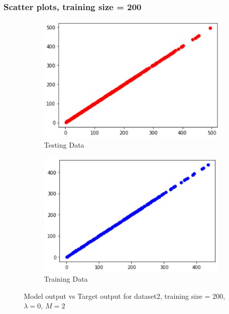 \documentclass[11pt]{article}
\begin{document}
\subsubsection{Scatter plots, training size = 200}
\begin{figure}[h]
\centering
	\begin{subfigure}[b]{0.4\textwidth}
	\centering
	\includegraphics[scale=0.5]{dataset2_200_lambda0_test.jpg}
	\caption{Testing Data}
	\label{fig:fig2.1.5.1}
	\end{subfigure}
	\hfill
	\begin{subfigure}[b]{0.4\textwidth}
	\centering
	\includegraphics[scale=0.5]{dataset2_200_lambda0_train.jpg}
	\caption{Training Data}
	\label{fig:fig2.1.5.2}
	\end{subfigure}
\caption{Model output vs Target output for dataset2, training size = 200, $\lambda = 0$, $M =2 $}
\label{fig:fig2.1.5}
\end{figure}
\end{document}
